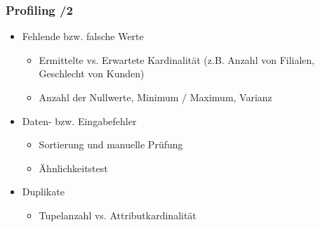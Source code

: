     \begin{frame}
    \frametitle{Profiling /2}
    
    \begin{itemize}
    \item Fehlende bzw. falsche Werte
    \begin{itemize}
    \item Ermittelte vs. Erwartete Kardinalität (z.B. Anzahl von Filialen, Geschlecht von Kunden)
    \item Anzahl der Nullwerte, Minimum / Maximum, Varianz
    \end{itemize}
    \item Daten- bzw. Eingabefehler
    \begin{itemize}
    \item Sortierung und manuelle Prüfung
    \item Ähnlichkeitstest
    \end{itemize}
    \item Duplikate
    \begin{itemize}
    \item Tupelanzahl vs. Attributkardinalität
    \end{itemize}
    \end{itemize}
    
    
    \end{frame}
    
    
    
    
    
